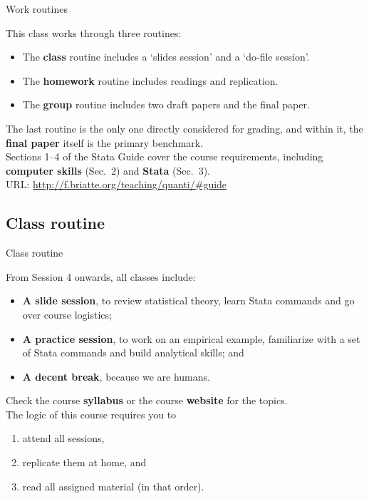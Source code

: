 \documentclass{beamer}
\begin{document}
	\begin{frame}[t]{Work routines}

	This class works through three routines:

		\begin{itemize}
			\item The \textbf{class} routine includes a `slides session' and a `do-file session'.
			
			\item The \textbf{homework} routine includes readings and replication.
			
			\item The \textbf{group} routine includes two draft papers and the final paper.
			
		\end{itemize}
	
	The last routine is the only one directly considered for grading, and within it, the \textbf{final paper} itself is the primary benchmark.\\[1em]
	
	Sections 1--4 of the Stata Guide cover the course requirements, including \textbf{computer skills} (Sec.~2) and \textbf{Stata} (Sec.~3).\\[1em]
	
	URL: \url{http://f.briatte.org/teaching/quanti/\#guide}

	\end{frame}

	\subsection{Class routine}
	
	\begin{frame}[t]{Class routine}

	From Session 4 onwards, all classes include:

	\begin{itemize}
		\item \textbf{A slide session}, to review statistical theory, learn Stata commands and go over course logistics;
		\item \textbf{A practice session}, to work on an empirical example, familiarize with a set of Stata commands and build analytical skills; and
		\item \textbf{A decent break}, because we are humans.
	\end{itemize}
		
	Check the course \textbf{syllabus} or the course \textbf{website} for the topics.\\[1em]
	
	The logic of this course requires you to
	
	\begin{enumerate}
		\item attend all sessions,
		\item replicate them at home, and
		\item read all assigned material (in that order).
	\end{enumerate}

	\end{frame}
\end{document}
